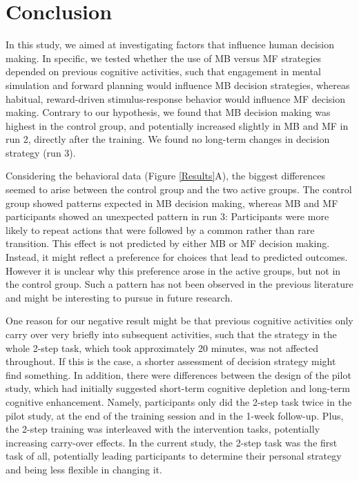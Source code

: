 \documentclass[11pt]{article} %
\begin{document}
\section{Conclusion}
In this study, we aimed at investigating factors that influence human decision making. In specific, we tested whether the use of MB versus MF strategies depended on previous cognitive activities, such that engagement in mental simulation and forward planning would influence MB decision strategies, whereas habitual, reward-driven stimulus-response behavior would influence MF decision making. Contrary to our hypothesis, we found that MB decision making was highest in the control group, and potentially increased slightly in MB and MF in run 2, directly after the training. We found no long-term changes in decision strategy (run 3).

Considering the behavioral data (Figure \ref{Results}A), the biggest differences seemed to arise between the control group and the two active groups. The control group showed patterns expected in MB decision making, whereas MB and MF participants showed an unexpected pattern in run 3: Participants were more likely to repeat actions that were followed by a common rather than rare transition. This effect is not predicted by either MB or MF decision making. Instead, it might reflect a preference for choices that lead to predicted outcomes. However it is unclear why this preference arose in the active groups, but not in the control group. Such a pattern has not been observed in the previous literature and might be interesting to pursue in future research. %

One reason for our negative result might be that previous cognitive activities only carry over very briefly into subsequent activities, such that the strategy in the whole 2-step task, which took approximately 20 minutes, was not affected throughout. If this is the case, a shorter assessment of decision strategy might find something. In addition, there were differences between the design of the pilot study, which had initially suggested short-term cognitive depletion and long-term cognitive enhancement. Namely, participants only did the 2-step task twice in the pilot study, at the end of the training session and in the 1-week follow-up. Plus, the 2-step training was interleaved with the intervention tasks, potentially increasing carry-over effects. In the current study, the 2-step task was the first task of all, potentially leading participants to determine their personal strategy and being less flexible in changing it.
\end{document}
